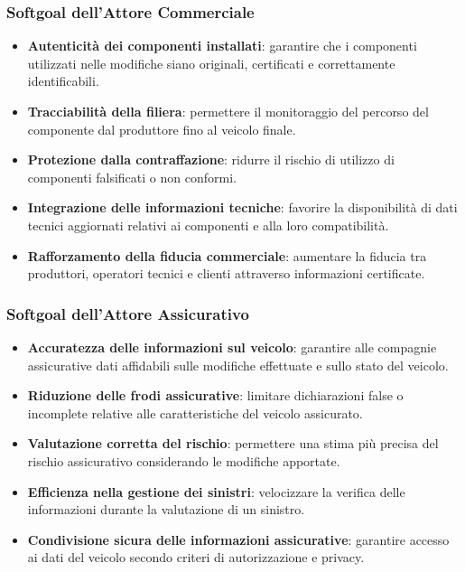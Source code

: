 \subsubsection*{Softgoal dell'Attore Commerciale}

\begin{itemize}
    \item \textbf{Autenticit\`a dei componenti installati}: garantire che i componenti utilizzati nelle modifiche siano originali, certificati e correttamente identificabili.
    \item \textbf{Tracciabilit\`a della filiera}: permettere il monitoraggio del percorso del componente dal produttore fino al veicolo finale.
    \item \textbf{Protezione dalla contraffazione}: ridurre il rischio di utilizzo di componenti falsificati o non conformi.
    \item \textbf{Integrazione delle informazioni tecniche}: favorire la disponibilit\`a di dati tecnici aggiornati relativi ai componenti e alla loro compatibilit\`a.
    \item \textbf{Rafforzamento della fiducia commerciale}: aumentare la fiducia tra produttori, operatori tecnici e clienti attraverso informazioni certificate.
\end{itemize}

\subsubsection*{Softgoal dell'Attore Assicurativo}

\begin{itemize}
    \item \textbf{Accuratezza delle informazioni sul veicolo}: garantire alle compagnie assicurative dati affidabili sulle modifiche effettuate e sullo stato del veicolo.
    \item \textbf{Riduzione delle frodi assicurative}: limitare dichiarazioni false o incomplete relative alle caratteristiche del veicolo assicurato.
    \item \textbf{Valutazione corretta del rischio}: permettere una stima pi\`u precisa del rischio assicurativo considerando le modifiche apportate.
    \item \textbf{Efficienza nella gestione dei sinistri}: velocizzare la verifica delle informazioni durante la valutazione di un sinistro.
    \item \textbf{Condivisione sicura delle informazioni assicurative}: garantire accesso ai dati del veicolo secondo criteri di autorizzazione e privacy.
\end{itemize}

